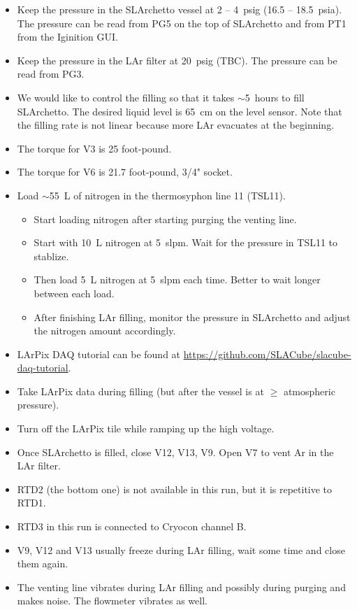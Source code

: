 \documentclass[letterpaper,11pt]{article}
\begin{document}
\begin{itemize}
\item Keep the pressure in the SLArchetto vessel at 2 -- 4~psig (16.5 -- 18.5~psia).
The pressure can be read from PG5 on the top of SLArchetto and from PT1 from the Iginition GUI.
\item Keep the pressure in the LAr filter at {\color{orange}20~psig (TBC)}.
The pressure can be read from PG3.
\item We would like to control the filling so that it takes $\sim$5~hours to fill SLArchetto.
The desired liquid level is 65~cm on the level sensor.
Note that the filling rate is not linear because more LAr evacuates at the beginning.
\item The torque for V3 is 25 foot-pound.
\item The torque for V6 is 21.7 foot-pound, 3/4" socket.
\item Load $\sim$55~L of nitrogen in the thermosyphon line 11 (TSL11).
    \begin{itemize}
        \item Start loading nitrogen after starting purging the venting line.
        \item Start with 10~L nitrogen at 5~slpm.  Wait for the pressure in TSL11 to stablize.
        \item Then load 5~L nitrogen at 5~slpm each time.  Better to wait longer between each load.
        \item After finishing LAr filling, monitor the pressure in SLArchetto and adjust the nitrogen 
        amount accordingly.
    \end{itemize}
\item LArPix DAQ tutorial can be found at \url{https://github.com/SLACube/slacube-daq-tutorial}.
\item Take LArPix data during filling (but after the vessel is at $\ge$ atmospheric pressure).
\item Turn off the LArPix tile while ramping up the high voltage.
\item Once SLArchetto is filled, close V12, V13, V9.
Open V7 to vent Ar in the LAr filter.
\item RTD2 (the bottom one) is not available in this run, but it is repetitive to RTD1.
\item RTD3 in this run is connected to Cryocon channel B.
\item V9, V12 and V13 usually freeze during LAr filling, wait some time and close them again.
\item The venting line vibrates during LAr filling and possibly during purging and makes noise.
The flowmeter vibrates as well.
\end{itemize}
\end{document}
